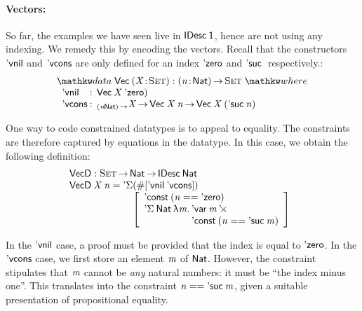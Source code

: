 \paragraph{Vectors:}

\newcommand{\VecD}{\F{VecD}}
\newcommand{\VecNil}{\etag{\CN{vnil}}}
\newcommand{\SYMBVecCons}{\etag{\CN{vcons}}\xspace}
\newcommand{\VecCons}[2]{\SYMBVecCons\:#1\:#2}

So far, the examples we have seen live in $\IDesc{\Unit}$, hence are
not using any indexing. We remedy this by encoding the vectors. Recall
that the constructors $\VecNil$ and $\SYMBVecCons$ are only defined for an
index $\NatZero$ and $\NatSuc$ respectively.:
%
\[
\stk{
\data \D{Vec}\: \PITEL{\V{X}}{\Set} : \PI{\V{n}}{\Nat} \Set \where \\
\;\;\begin{array}{@{}l@{\::\:\:}l@{\quad}l}
    \VecNil          & \D{Vec}\:\V{X}\:{\NatZero)}   \\
    \SYMBVecCons & _{\PI{\V{n}}{\Nat}}\V{X} \To \D{Vec}\:{\V{X}}\:{\V{n}} \To \D{Vec}\:{\V{X}}\:{(\NatSuc{\V{n}})}
\end{array}
}
\]

One way to code constrained datatypes is to appeal to equality. The
constraints are therefore captured by equations in the datatype. In
this case, we obtain the following definition:
%
\[\stk{
\VecD : \Set \To \Nat \To \IDesc{\Nat} \\
\begin{array}{@{}l@{}l}
\VecD\: \V{X}\: \V{n} = \SYMBDSigma & (\EnumT{\sqr{ \VecNil\:\SYMBVecCons }}) \\
                        & \bigRedBracket{
                          \begin{array}{l}
                            \DConst{(\V{n} \PropEq \NatZero)} \\
                            \DSigma{\Nat}{\LAM{\V{m}} \stk{\DProd{\DVar{\V{m}}}{\\\DConst{(\V{n} \PropEq \NatSuc{\V{m}})}}}}
                          \end{array}
                          }
\end{array}
}\]

In the $\VecNil$ case, a proof must be provided that the index is
equal to $\NatZero$. In the $\SYMBVecCons$ case, we first store an element
$\V{m}$ of $\Nat$. However, the constraint stipulates that $\V{m}$
cannot be \emph{any} natural numbers: it must be ``the index minus
one''. This translates into the constraint $\V{n} \PropEq
\NatSuc{\V{m}}$, given a suitable presentation of propositional equality.

